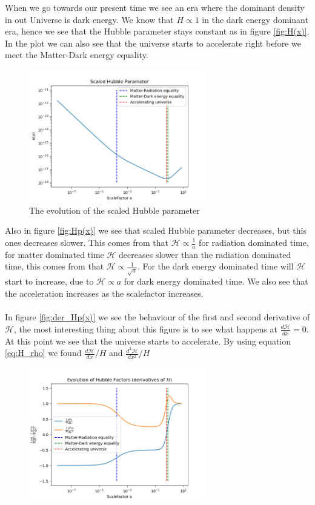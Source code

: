 \documentclass{article}
\begin{document}
\begin{multicols}{2}
When we go towards our present time we see an era where the dominant density in out Universe is dark energy. We know that $H\propto 1$ in the dark energy dominant era, hence we see that the Hubble parameter stays constant as in figure \eqref{fig:H(x)}. In the plot we can also see that the universe starts to accelerate  right before we meet the Matter-Dark energy equality. 
\begin{figure}[H]
	\centering
	\includegraphics[width=77mm]{Scaled Hubble Parameter.png}
	\caption{The evolution of the scaled Hubble parameter}
	\label{fig:Hp(x)}
\end{figure}
Also in figure \eqref{fig:Hp(x)} we see that scaled Hubble parameter decreases, but this ones decreases slower. This comes from that $\mathcal{H}\propto \frac{1}{a}$ for radiation dominated time, for matter dominated time $\mathcal{H}$ decreases slower than the  radiation dominated time, this comes from that $\mathcal{H}\propto \frac{1}{\sqrt{a}}$. For the dark energy dominated time will $\mathcal{H}$ start to increase, due to $\mathcal{H}\propto {a}$ for dark energy dominated time. We also see that the acceleration increases as the scalefactor increases. \\
\\
In figure \eqref{fig:der_Hp(x)} we see the behaviour of the first and second derivative of $\mathcal{H}$, the most interesting thing about this figure is to see what happens at $\frac{d\mathcal{H}}{dx}=0$. At this point we see that the universe starts to accelerate. By using equation \eqref{eq:H_rho} we found $\frac{d\mathcal{H}}{dx}/H$ and $\frac{d^2\mathcal{H}}{dx^2}/H$
\begin{figure}[H]
	\centering
	\includegraphics[width=77mm]{der_Hp.png}

\end{figure}
\end{multicols}
\end{document}
